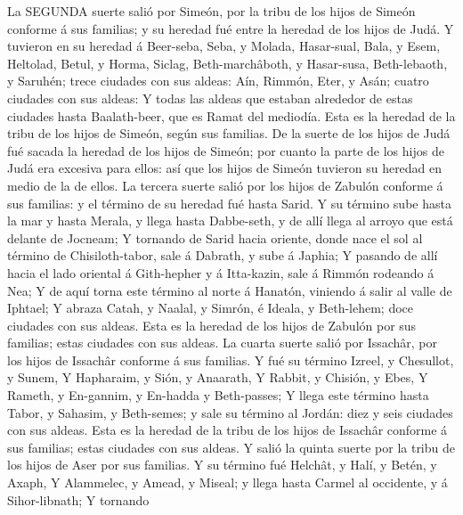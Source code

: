  La SEGUNDA suerte salió por Simeón, por la tribu de los
hijos de Simeón conforme á sus familias; y su heredad fué entre la
heredad de los hijos de Judá.  Y tuvieron en su heredad á
Beer-seba, Seba, y Molada,  Hasar-sual, Bala, y Esem,
 Heltolad, Betul, y Horma,  Siclag,
Beth-marchâboth, y Hasar-susa,  Beth-lebaoth, y Saruhén;
trece ciudades con sus aldeas:  Aín, Rimmón, Eter, y Asán;
cuatro ciudades con sus aldeas:  Y todas las aldeas que
estaban alrededor de estas ciudades hasta Baalath-beer, que es Ramat del
mediodía. Esta es la heredad de la tribu de los hijos de Simeón, según
sus familias.  De la suerte de los hijos de Judá fué sacada
la heredad de los hijos de Simeón; por cuanto la parte de los hijos de
Judá era excesiva para ellos: así que los hijos de Simeón tuvieron su
heredad en medio de la de ellos.  La tercera suerte salió
por los hijos de Zabulón conforme á sus familias: y el término de su
heredad fué hasta Sarid.  Y su término sube hasta la mar y
hasta Merala, y llega hasta Dabbe-seth, y de allí llega al arroyo que
está delante de Jocneam;  Y tornando de Sarid hacia
oriente, donde nace el sol al término de Chisiloth-tabor, sale á
Dabrath, y sube á Japhia;  Y pasando de allí hacia el lado
oriental á Gith-hepher y á Itta-kazin, sale á Rimmón rodeando á Nea;
 Y de aquí torna este término al norte á Hanatón, viniendo
á salir al valle de Iphtael;  Y abraza Catah, y Naalal, y
Simrón, é Ideala, y Beth-lehem; doce ciudades con sus aldeas.
 Esta es la heredad de los hijos de Zabulón por sus
familias; estas ciudades con sus aldeas.  La cuarta suerte
salió por Issachâr, por los hijos de Issachâr conforme á sus familias.
 Y fué su término Izreel, y Chesullot, y Sunem,
 Y Hapharaim, y Sión, y Anaarath,  Y Rabbit, y
Chisión, y Ebes,  Y Rameth, y En-gannim, y En-hadda y
Beth-passes;  Y llega este término hasta Tabor, y Sahasim,
y Beth-semes; y sale su término al Jordán: diez y seis ciudades con sus
aldeas.  Esta es la heredad de la tribu de los hijos de
Issachâr conforme á sus familias; estas ciudades con sus aldeas.
 Y salió la quinta suerte por la tribu de los hijos de Aser
por sus familias.  Y su término fué Helchât, y Halí, y
Betén, y Axaph,  Y Alammelec, y Amead, y Miseal; y llega
hasta Carmel al occidente, y á Sihor-libnath;  Y tornando
